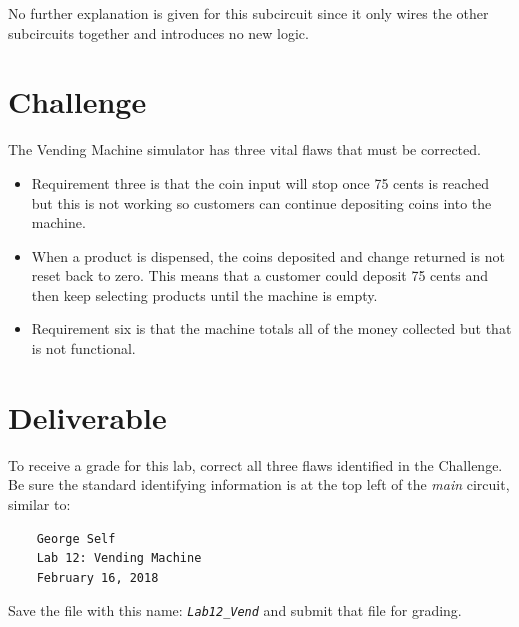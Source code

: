 No further explanation is given for this subcircuit since it only wires the other subcircuits together and introduces no new logic.

\section{Challenge}

The Vending Machine simulator has three vital flaws that must be corrected.

\begin{itemize}
	\item Requirement three is that the coin input will stop once 75 cents is reached but this is not working so customers can continue depositing coins into the machine.
	\item When a product is dispensed, the coins deposited and change returned is not reset back to zero. This means that a customer could deposit 75 cents and then keep selecting products until the machine is empty.
	\item Requirement six is that the machine totals all of the money collected but that is not functional.
\end{itemize}


\section{Deliverable}

To receive a grade for this lab, correct all three flaws identified in the Challenge. Be sure the standard identifying information is at the top left of the \textit{main} circuit, similar to: 

\bigskip
\begin{minipage}{\linewidth}
	\begin{verbatim}
	George Self
	Lab 12: Vending Machine
	February 16, 2018
	\end{verbatim}
\end{minipage}
\bigskip

Save the file with this name: \emph{\texttt{Lab12\_Vend}} and submit that file for grading.

